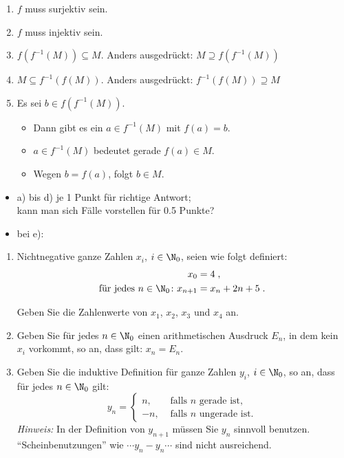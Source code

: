 \documentclass[12pt]{article}
\begin{document}
\begin{loesung}
  \begin{enumerate}
  \item $f$ muss surjektiv sein.
  \item $f$ muss injektiv sein.
  \item $f(f^{-1}(M)) \subseteq M$. Anders ausgedrückt: $M \supseteq f(f^{-1}(M))$
  \item $M \subseteq f^{-1}(f(M))$. Anders ausgedrückt: $f^{-1}(f(M)) \supseteq M$
  \item Es sei $b\in f(f^{-1}(M))$.
    \begin{itemize}
    \item Dann gibt es ein $a\in f^{-1}(M)$
      mit $f(a) =b$.
    \item $a\in f^{-1}(M)$
      bedeutet gerade $f(a)\in M$.
    \item Wegen $b = f(a)$, folgt $b\in M$.
    \end{itemize}
  \end{enumerate}
  \begin{korrektur}
    \begin{itemize}
    \item a) bis d) je 1 Punkt für richtige Antwort;\\
      kann man sich Fälle vorstellen für 0.5 Punkte?
    \item bei e):
    \end{itemize}
  \end{korrektur}
\end{loesung}

\begin{aufgabe}[0.5 + 1.5 + 2 = 4]
  \begin{enumerate}
  \item Nichtnegative ganze Zahlen $x_i$,
    $i\in\N_0$, seien wie folgt definiert:
    \[\begin{aligned}[t]
      x_0 &= 4 \;,\\
      \text{für jedes } n\in\N_0\colon x_{n+1} &= x_n + 2n + 5 \;.
    \end{aligned}
    \]%

    Geben Sie die Zahlenwerte von $x_1$, $x_2$, $x_3$ und $x_4$ an.
  \item Geben Sie für jedes $n\in\N_0$
    einen arithmetischen Ausdruck $E_n$,
    in dem kein $x_i$ vorkommt, so an, dass gilt: $x_n = E_n$.
  \item Geben Sie die induktive Definition für ganze Zahlen $y_i$,
    $i\in\N_0$, so an, dass für jedes $n\in\N_0$ gilt:
    \[
      y_n =
      \begin{cases}
        n, & \text{ falls $n$ gerade ist,} \\
        -n, & \text{ falls $n$ ungerade ist.}
      \end{cases}
    \]
    \emph{Hinweis:} In der Definition von $y_{n+1}$
    müssen Sie $y_n$
    sinnvoll benutzen. "`Scheinbenutzungen"' wie $\cdots y_n-y_n \cdots$ sind nicht ausreichend.
  \end{enumerate}
\end{aufgabe}
\end{document}
